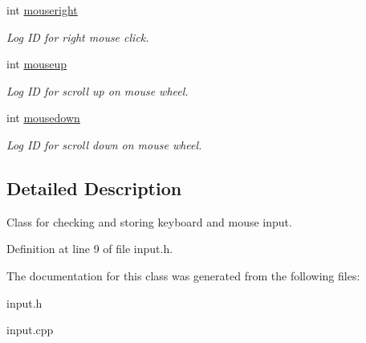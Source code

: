 \begin{DoxyCompactItemize}
\mbox{\label{classInput_abbf0471b00d750ae25d638bca74be28f}} 
int \hyperlink{classInput_abbf0471b00d750ae25d638bca74be28f}{mouseright}
\begin{DoxyCompactList}\small\item\em Log ID for right mouse click. \end{DoxyCompactList}\item 
\mbox{\label{classInput_a66df7023e5db7300d0f9bcdafd140bf5}} 
int \hyperlink{classInput_a66df7023e5db7300d0f9bcdafd140bf5}{mouseup}
\begin{DoxyCompactList}\small\item\em Log ID for scroll up on mouse wheel. \end{DoxyCompactList}\item 
\mbox{\label{classInput_a254eb8e3616257909a23449a7b87175e}} 
int \hyperlink{classInput_a254eb8e3616257909a23449a7b87175e}{mousedown}
\begin{DoxyCompactList}\small\item\em Log ID for scroll down on mouse wheel. \end{DoxyCompactList}\end{DoxyCompactItemize}


\subsection{Detailed Description}
Class for checking and storing keyboard and mouse input. 

Definition at line 9 of file input.\+h.



The documentation for this class was generated from the following files\+:\begin{DoxyCompactItemize}
\item 
input.\+h\item 
input.\+cpp\end{DoxyCompactItemize}
